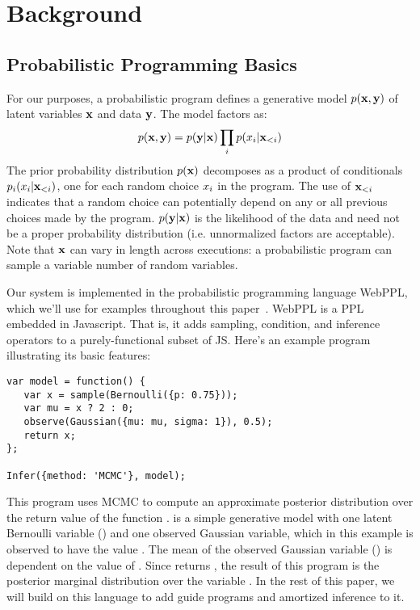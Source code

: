 \section{Background}
\label{sec:background}

\subsection{Probabilistic Programming Basics}
\label{sec:pplbasics}

For our purposes, a probabilistic program defines a generative model $p(\mathbf{x}, \mathbf{y})$ of latent variables $\mathbf{x}$ and data $\mathbf{y}$. The model factors as:
\begin{equation}
p(\mathbf{x}, \mathbf{y}) = p(\mathbf{y} | \mathbf{x}) \prod_i p(x_i | \mathbf{x}_{<i})
\label{eq:probProgDef}
\end{equation}
The prior probability distribution $p(\mathbf{x})$ decomposes as a product of conditionals $p_i(x_i | \mathbf{x}_{<i})$, one for each random choice $x_i$ in the program. The use of $\mathbf{x}_{<i}$ indicates that a random choice can potentially depend on any or all previous choices made by the program.
$p(\mathbf{y} | \mathbf{x})$ is the likelihood of the data and need not be a proper probability distribution (i.e. unnormalized factors are acceptable).
Note that $\mathbf{x}$ can vary in length across executions: a probabilistic program can sample a variable number of random variables.

Our system is implemented in the probabilistic programming language WebPPL, which we'll use for examples throughout this paper~\cite{WebPPL}.
WebPPL is a PPL embedded in Javascript.
That is, it adds sampling, condition, and inference operators to a purely-functional subset of JS.
Here's an example program illustrating its basic features:
\begin{lstlisting}
var model = function() {
   var x = sample(Bernoulli({p: 0.75}));
   var mu = x ? 2 : 0;
   observe(Gaussian({mu: mu, sigma: 1}), 0.5);
   return x;
};

Infer({method: 'MCMC'}, model);
\end{lstlisting}
This program uses MCMC to compute an approximate posterior distribution over the return value of the function .  is a simple generative model with one latent Bernoulli variable () and one observed Gaussian variable, which in this example is observed to have the value . The mean of the observed Gaussian variable () is dependent on the value of . Since  returns , the result of this program is the posterior marginal distribution over the variable .
In the rest of this paper, we will build on this language to add guide programs and amortized inference to it.

